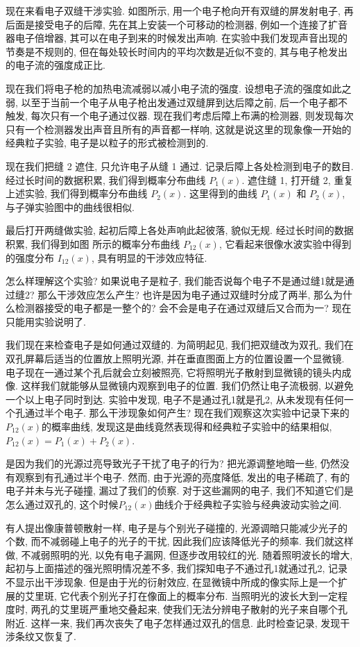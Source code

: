 现在来看电子双缝干涉实验. 如图所示, 用一个电子枪向开有双缝的屏发射电子, 再后面是接受电子的后障, 先在其上安装一个可移动的检测器, 例如一个连接了扩音器电子倍增器, 其可以在电子到来的时候发出声响. 在实验中我们发现声音出现的节奏是不规则的, 但在每处较长时间内的平均次数是近似不变的, 其与电子枪发出的电子流的强度成正比.

现在我们将电子枪的加热电流减弱以减小电子流的强度. 设想电子流的强度如此之弱, 以至于当前一个电子从电子枪出发通过双缝屏到达后障之前, 后一个电子都不触发, 每次只有一个电子通过仪器. 现在我们考虑后障上布满的检测器, 则发现每次只有一个检测器发出声音且所有的声音都一样响, 这就是说这里的现象像一开始的经典粒子实验, 电子是以粒子的形式被检测到的.

现在我们把缝 2 遮住, 只允许电子从缝 1 通过. 记录后障上各处检测到电子的数目. 经过长时间的数据积累, 我们得到概率分布曲线 $P_1(x)$. 遮住缝 1, 打开缝 2, 重复上述实验, 我们得到概率分布曲线 $P_2(x)$. 这里得到的曲线 $P_1(x)$ 和 $P_2(x)$, 与子弹实验图中的曲线很相似.

最后打开两缝做实验, 起初后障上各处声响此起彼落, 貌似无规. 经过长时间的数据积累, 我们得到如图 所示的概率分布曲线 $P_{12}(x)$, 它看起来很像水波实验中得到的强度分布 $I_{12}(x)$, 具有明显的干涉效应特征.

怎么样理解这个实验? 如果说电子是粒子, 我们能否说每个电子不是通过缝1就是通过缝2? 那么干涉效应怎么产生? 也许是因为电子通过双缝时分成了两半, 那么为什么检测器接受的电子都是一整个的? 会不会是电子在通过双缝后又合而为一? 现在只能用实验说明了.

我们现在来检查电子是如何通过双缝的. 为简明起见, 我们把双缝改为双孔, 我们在双孔屏幕后适当的位置放上照明光源, 并在垂直图面上方的位置设置一个显微镜. 电子现在一通过某个孔后就会立刻被照亮, 它将照明光子散射到显微镜的镜头内成像. 这样我们就能够从显微镜内观察到电子的位置. 我们仍然让电子流极弱, 以避免一个以上电子同时到达. 实验中发现, 电子不是通过孔1就是孔2, 从未发现有任何一个孔通过半个电子. 那么干涉现象如何产生? 现在我们观察这次实验中记录下来的$P_{12}(x)$的概率曲线, 发现这是曲线竟然表现得和经典粒子实验中的结果相似, $P_{12}(x)=P_1(x)+P_2(x)$.

是因为我们的光源过亮导致光子干扰了电子的行为? 把光源调整地暗一些, 仍然没有观察到有孔通过半个电子. 然而, 由于光源的亮度降低, 发出的电子稀疏了, 有的电子并未与光子碰撞, 漏过了我们的侦察. 对于这些漏网的电子, 我们不知道它们是怎么通过双孔的, 这个时候$P_{12}(x)$曲线介于经典粒子实验与经典波动实验之间.

有人提出像康普顿散射一样, 电子是与个别光子碰撞的, 光源调暗只能减少光子的个数, 而不减弱碰上电子的光子的干扰, 因此我们应该降低光子的频率. 我们就这样做, 不减弱照明的光, 以免有电子漏网, 但逐步改用较红的光. 随着照明波长的增大, 起初与上面描述的强光照明情况差不多, 我们探知电子不通过孔1就通过孔2, 记录不显示出干涉现象. 但是由于光的衍射效应, 在显微镜中所成的像实际上是一个扩展的艾里斑, 它代表个别光子打在像面上的概率分布. 当照明光的波长大到一定程度时, 两孔的艾里斑严重地交叠起来, 使我们无法分辨电子散射的光子来自哪个孔附近. 这样一来, 我们再次丧失了电子怎样通过双孔的信息. 此时检查记录, 发现干涉条纹又恢复了.

